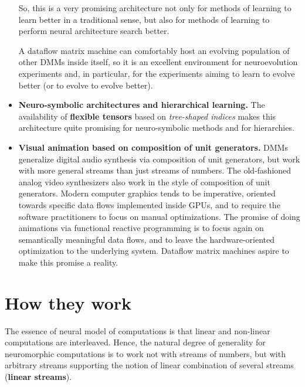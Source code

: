 \documentclass{article}
\begin{document}
\begin{itemize}
\vspace{0.1in}
So, this is a very promising architecture not only for methods of learning to learn
better in a traditional sense, but also for methods of learning to perform
neural architecture search better. 

\vspace{0.1in}
A dataflow matrix machine can comfortably host
an evolving population of other DMMs inside itself, so it is
an excellent environment for neuroevolution experiments and, in particular,
for the experiments aiming to learn to evolve better (or to evolve to evolve better).

\vspace{0.1in}
\item {\bf Neuro-symbolic architectures and hierarchical learning.} The availability of 
{\bf flexible tensors} based on {\em tree-shaped indices} makes this architecture
quite promising for neuro-symbolic methods and for hierarchies.

\vspace{0.1in}
\item {\bf Visual animation based on composition of unit generators.} DMMs 
generalize digital audio synthesis via composition of unit generators, but work
with more general streams than just streams of numbers. The old-fashioned
analog video synthesizers also work in the style of composition of unit
generators. Modern computer graphics tends to be imperative, oriented towards
specific data flows implemented inside GPUs, and to require the software practitioners to
focus on manual optimizations. The promise of doing animations via functional reactive
programming is to focus again on semantically meaningful
data flows, and to leave the hardware-oriented optimization to the underlying system.
Dataflow matrix machines aspire to make this promise a reality.


\end{itemize}

\section{How they work}

The essence of neural model of computations is that linear and non-linear computations are interleaved. Hence, the natural
degree of generality for neuromorphic computations is to work not with streams of numbers, but with arbitrary streams
supporting the notion of linear combination of several streams ({\bf linear streams}).
\end{document}
